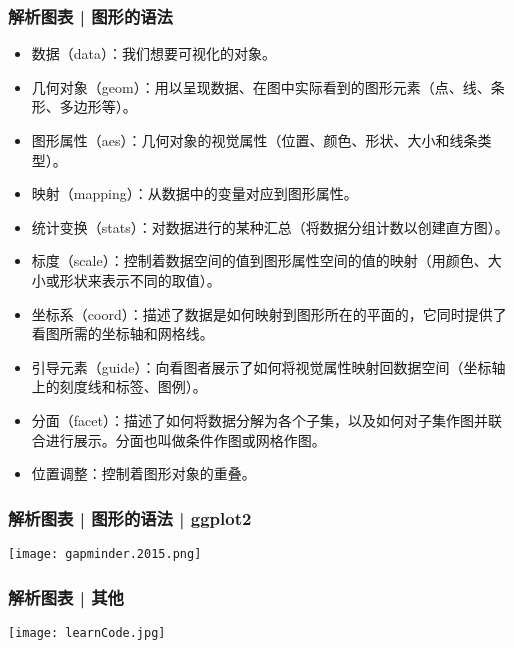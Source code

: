 \begin{frame}
  \frametitle{解析图表 | 图形的语法}
\begin{itemize}
  \item 数据（data）：我们想要可视化的对象。
  \item 几何对象（geom）：用以呈现数据、在图中实际看到的图形元素（点、线、条形、多边形等）。
  \item 图形属性（aes）：几何对象的视觉属性（位置、颜色、形状、大小和线条类型）。
  \item 映射（mapping）：从数据中的变量对应到图形属性。
  \item 统计变换（stats）：对数据进行的某种汇总（将数据分组计数以创建直方图）。
  \item 标度（scale）：控制着数据空间的值到图形属性空间的值的映射（用颜色、大小或形状来表示不同的取值）。
  \item 坐标系（coord）：描述了数据是如何映射到图形所在的平面的，它同时提供了看图所需的坐标轴和网格线。
  \item 引导元素（guide）：向看图者展示了如何将视觉属性映射回数据空间（坐标轴上的刻度线和标签、图例）。
  \item 分面（facet）：描述了如何将数据分解为各个子集，以及如何对子集作图并联合进行展示。分面也叫做条件作图或网格作图。
  \item 位置调整：控制着图形对象的重叠。
\end{itemize}
\end{frame}

\begin{frame}
  \frametitle{解析图表 | 图形的语法 | ggplot2}
  \begin{center}
    \texttt{[image: gapminder.2015.png]}
  \end{center}
\end{frame}

\begin{frame}
  \frametitle{解析图表 | 其他}
  \begin{center}
    \texttt{[image: learnCode.jpg]}
  \end{center}
\end{frame}

